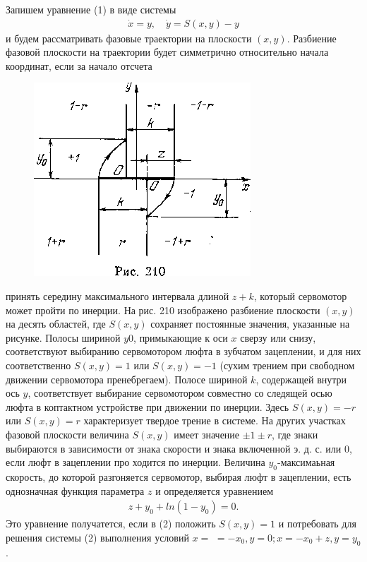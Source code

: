 \documentclass{article}
\begin{document}
Запишем уравнение (1) в виде системы
\begin{gather}
\dot{x}=y, \quad \dot{y}=S(x,y)-y
\end{gather} 
и будем рассматривать фазовые траектории на плоскости $(x, y)$.
Разбиение фазовой плоскости на траектории будет симметрично
относительно начала координат, если за начало отсчета 
\begin{figure}

\raggedleft

\includegraphics[width=1\linewidth]{../img/img210.png}


\label{fig:mpr}

\end{figure}
принять середину максимального интервала 
длиной $z+k$, который сервомотор
 может пройти по инерции. На
рис. 210 изображено разбиение
плоскости $(x, y)$ на десять областей,
где $S(x, y)$ сохраняет
постоянные значения, указанные 
на рисунке. Полосы шириной 
$y0$, примыкающие к оси $x$
сверзу или снизу, соответствуют
выбиранию сервомотором люфта
в зубчатом зацеплении, и для
них соответственно $S(x, y)=1$
или $S(x, y)=-1$ (сухим трением
при свободном движении сервомотора пренебрегаем). Полосе шириной $k$, содержащей внутри ось $y$, соответствует выбирание сервомотором совместно со следящей осью люфта в коптактном
устройстве при движении по инерции. Здесь $S(x, y)=-r$ или
$S(x, y)=r$ характеризует твердое трение в системе. На других
участках фазовой плоскости величина $S(x, y)$ имеет значение
$\pm 1 \pm r$, где знаки выбираются в зависимости от знака скорости
и знака включенной э. д. с. или 0, если люфт в зацеплении про
ходится по инерции. Величина $y_{0}$-максимаьная скорость, до
которой разгоняется сервомотор, выбирая люфт в зацеплении,
есть однозначная функция параметра $z$ и определяется уравнением
\begin{gather}
z+y_{0}+ln(1-y_{0})=0.
\end{gather}
Это уравнение получатется, если в (2) положить $S(x,y)=1$ и
потребовать для решения системы (2) выполнения условий $x=$
$=-x_{0}, y=0; x=-x_{0}+z, y=y_{0}$.%
\end{document}
